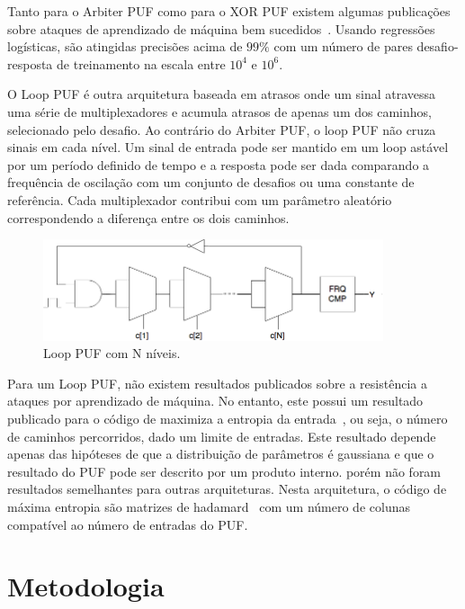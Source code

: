 \documentclass[pdftex,11pt]{article}
\begin{document}
\begin{spacing}{1.5}
Tanto para o Arbiter PUF como para o XOR PUF existem algumas publicações sobre ataques de aprendizado de máquina bem sucedidos~\cite{RuhrmairD13, RuhrmairSSDDS10}. Usando regressões logísticas, são atingidas precisões acima de $99\%$ com um número de pares desafio-resposta de treinamento na escala entre $10^4$ e $10^6$.

O Loop PUF\cite{looppuf} é outra arquitetura baseada em atrasos onde um sinal atravessa uma série de multiplexadores e acumula atrasos de apenas um dos caminhos, selecionado pelo desafio. Ao contrário do Arbiter PUF, o loop PUF não cruza sinais em cada nível. Um sinal de entrada pode ser mantido em um loop astável por um período definido de tempo e a resposta pode ser dada comparando a frequência de oscilação com um conjunto de desafios ou uma constante de referência. Cada multiplexador contribui com um parâmetro aleatório correspondendo a diferença entre os dois caminhos.

\begin{figure}
\label{fig:apuf}
\centering
\includegraphics[width=10cm]{looppuf.png}
\caption{Loop PUF com N níveis.}
\end{figure}

Para um Loop PUF, não existem resultados publicados sobre a resistência a ataques por aprendizado de máquina. No entanto, este possui um resultado publicado para o código de maximiza a entropia da entrada~\cite{hadamard}, ou seja, o número de caminhos percorridos, dado um limite de entradas. Este resultado depende apenas das hipóteses de que a distribuição de parâmetros é gaussiana e que o resultado do PUF pode ser descrito por um produto interno. porém não foram resultados semelhantes para outras arquiteturas. Nesta arquitetura, o código de máxima entropia
são matrizes de hadamard~\cite{hadamard} com um número de colunas compatível ao número de entradas do PUF.


\section{Metodologia}\label{sec:atividades}



\end{spacing}
\end{document}
